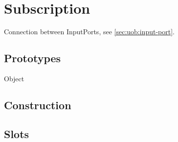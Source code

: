 
\section{Subscription}

Connection between InputPorts, see \autoref{sec:uob:input-port}.

\subsection{Prototypes}
\begin{refObjects}
\item[Object]
\end{refObjects}

\subsection{Construction}

\subsection{Slots}

